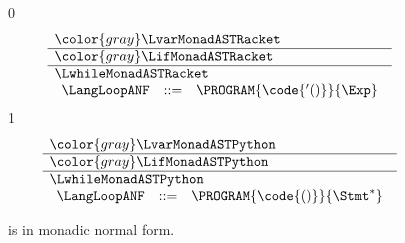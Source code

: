 \documentclass[7x10]{TimesAPriori_MIT}%
\newcommand{\gray}[1]{{\color{gray} #1}}
\def\racketEd{0}
\def\pythonEd{1}
\def\edition{0}
\numberwithin{theorem}{chapter}
\numberwithin{definition}{chapter}
\numberwithin{equation}{chapter}
\begin{document}
\begin{figure}[tp]
  \centering
\begin{tcolorbox}[colback=white]  
\small
{\if\edition\racketEd    
\[
\begin{array}{l}
  \gray{\LvarMonadASTRacket} \\ \hline
  \gray{\LifMonadASTRacket} \\ \hline
  \LwhileMonadASTRacket \\ 
\begin{array}{rcl}
\LangLoopANF  &::=& \PROGRAM{\code{'()}}{\Exp}
\end{array}
\end{array}
\]
\fi}
{\if\edition\pythonEd
\[
\begin{array}{l}
  \gray{\LvarMonadASTPython} \\ \hline
  \gray{\LifMonadASTPython} \\ \hline
  \LwhileMonadASTPython \\
   \begin{array}{rcl}
     \LangLoopANF  &::=& \PROGRAM{\code{()}}{\Stmt^{*}}
   \end{array}
\end{array}
\]
\fi}
\end{tcolorbox}

\caption{\LangLoopANF{} is \LangLoop{} in monadic normal form.}
\label{fig:Lwhile-anf-syntax}
\end{figure}
\end{document}
